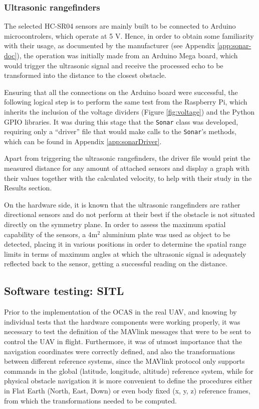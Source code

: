 \subsubsection{Ultrasonic rangefinders} \label{sec:sonartest}

The selected HC-SR04 sensors are mainly built to be connected to Arduino microcontrolers, which operate at 5 V.
Hence, in order to obtain some familiarity with their usage, as documented by the manufacturer (see Appendix \ref{app:sonar-doc}), the operation was initially made from an Arduino Mega board, which would trigger the ultrasonic signal and receive the processed echo to be transformed into the distance to the closest obstacle.

Ensuring that all the connections on the Arduino board were successful, the following logical step is to perform the same test from the Raspberry Pi, which inherits the inclusion of the voltage dividers (Figure \ref{fig:voltage}) and the Python GPIO libraries.
It was during this stage that the \texttt{Sonar} class was developed, requiring only a ``driver'' file that would make calls to the \texttt{Sonar}'s methods, which can be found in Appendix \ref{app:sonarDriver}.

Apart from triggering the ultrasonic rangefinders, the driver file would print the measured distance for any amount of attached sensors and display a graph with their values together with the calculated velocity, to help with their study in the Results section.

On the hardware side, it is known that the ultrasonic rangefinders are rather directional sensors and do not perform at their best if the obstacle is not situated directly on the symmetry plane.
In order to assess the maximum spatial capability of the sensors, a 4m$^2$ aluminium plate was used as object to be detected, placing it in various positions in order to determine the spatial range limits in terms of maximum angles at which the ultrasonic signal is adequately reflected back to the sensor, getting a successful reading on the distance.


\subsection{Software testing: SITL}

Prior to the implementation of the OCAS in the real UAV, and knowing by individual tests that the hardware components were working properly, it was necessary to test the definition of the MAVlink messages that were to be sent to control the UAV in flight.
Furthermore, it was of utmost importance that the navigation coordinates were correctly defined, and also the transformations between different reference systems, since the MAVlink protocol only supports commands in the global (latitude, longitude, altitude) reference system, while for physical obstacle navigation it is more convenient to define the procedures either in Flat Earth (North, East, Down) or even body fixed (x, y, z) reference frames, from which the transformations needed to be computed.

